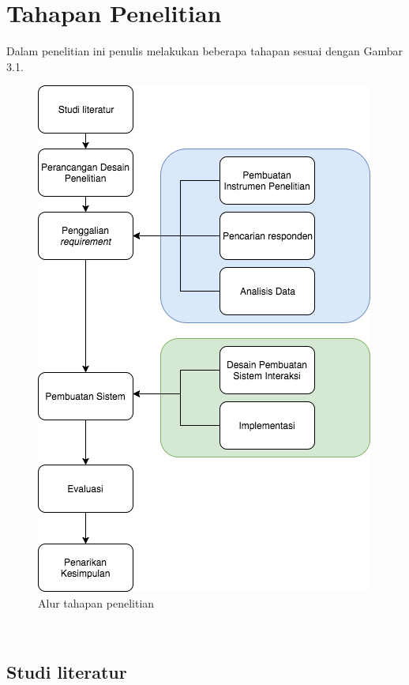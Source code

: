 \section{Tahapan Penelitian}

Dalam penelitian ini penulis melakukan beberapa tahapan sesuai dengan Gambar 3.1.

\begin{figure}
	\includegraphics[scale=0.9]{pics/flow-pembuatan}
	\caption{Alur tahapan penelitian}
	\centering
\end{figure}
\

	\subsection{Studi literatur}
	

